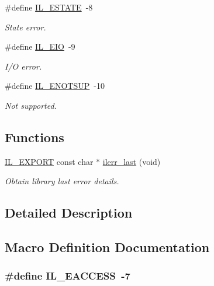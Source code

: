 \begin{DoxyCompactItemize}
\#define \hyperlink{group__IL__ERR_ga85eb5ca72fd69575a0d927efcdd44188}{I\+L\+\_\+\+E\+S\+T\+A\+TE}~-\/8
\begin{DoxyCompactList}\small\item\em State error. \end{DoxyCompactList}\item 
\#define \hyperlink{group__IL__ERR_ga150b9efcf3d35150433b151f1f134b98}{I\+L\+\_\+\+E\+IO}~-\/9
\begin{DoxyCompactList}\small\item\em I/O error. \end{DoxyCompactList}\item 
\#define \hyperlink{group__IL__ERR_gacafae18e9ab826ace3f9135d2ed7deeb}{I\+L\+\_\+\+E\+N\+O\+T\+S\+UP}~-\/10
\begin{DoxyCompactList}\small\item\em Not supported. \end{DoxyCompactList}\end{DoxyCompactItemize}
\subsection*{Functions}
\begin{DoxyCompactItemize}
\item 
\hyperlink{common_8h_a6bb629d26c52bfe10519ba3176853f47}{I\+L\+\_\+\+E\+X\+P\+O\+RT} const char $\ast$ \hyperlink{group__IL__ERR_gac427087bdfe4aae17ff3e74de51cfe87}{ilerr\+\_\+last} (void)
\begin{DoxyCompactList}\small\item\em Obtain library last error details. \end{DoxyCompactList}\end{DoxyCompactItemize}


\subsection{Detailed Description}


\subsection{Macro Definition Documentation}
\subsubsection[{\texorpdfstring{I\+L\+\_\+\+E\+A\+C\+C\+E\+SS}{IL_EACCESS}}]{\setlength{\rightskip}{0pt plus 5cm}\#define I\+L\+\_\+\+E\+A\+C\+C\+E\+SS~-\/7}\hypertarget{group__IL__ERR_gaf8957a58cdc74c6cda94eb5bb990a26b}{}\label{group__IL__ERR_gaf8957a58cdc74c6cda94eb5bb990a26b}


